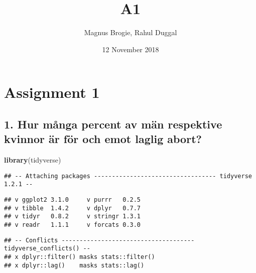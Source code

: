 \documentclass[]{article}
\title{A1}
\author{Magnus Brogie, Rahul Duggal}
\date{12 November 2018}
\newenvironment{Shaded}{\begin{snugshade}}{\end{snugshade}}
\newcommand{\KeywordTok}[1]{\textcolor[rgb]{0.13,0.29,0.53}{\textbf{#1}}}
\newcommand{\NormalTok}[1]{#1}
\begin{document}
\maketitle

\hypertarget{assignment-1}{%
\section{Assignment 1}\label{assignment-1}}

\hypertarget{hur-manga-percent-av-man-respektive-kvinnor-ar-for-och-emot-laglig-abort}{%
\subsection{1. Hur många percent av män respektive kvinnor är för och
emot laglig
abort?}\label{hur-manga-percent-av-man-respektive-kvinnor-ar-for-och-emot-laglig-abort}}

\begin{Shaded}
\begin{Highlighting}[]
\KeywordTok{library}\NormalTok{(tidyverse)}
\end{Highlighting}
\end{Shaded}

\begin{verbatim}
## -- Attaching packages ---------------------------------- tidyverse 1.2.1 --
\end{verbatim}

\begin{verbatim}
## v ggplot2 3.1.0     v purrr   0.2.5
## v tibble  1.4.2     v dplyr   0.7.7
## v tidyr   0.8.2     v stringr 1.3.1
## v readr   1.1.1     v forcats 0.3.0
\end{verbatim}

\begin{verbatim}
## -- Conflicts ------------------------------------- tidyverse_conflicts() --
## x dplyr::filter() masks stats::filter()
## x dplyr::lag()    masks stats::lag()
\end{verbatim}
\end{document}
